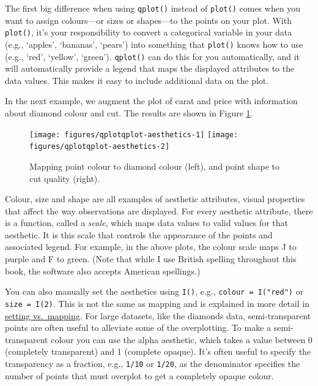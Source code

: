 The first big difference when using \texttt{qplot()} instead of
\texttt{plot()} comes when you want to assign colours---or sizes or
shapes---to the points on your plot. With \texttt{plot()}, it's your
responsibility to convert a categorical variable in your data (e.g.,
`apples', `bananas', `pears') into something that \texttt{plot()} knows
how to use (e.g., `red', `yellow', `green'). \texttt{qplot()} can do
this for you automatically, and it will automatically provide a legend
that maps the displayed attributes to the data values. This makes it
easy to include additional data on the plot.

In the next example, we augment the plot of carat and price with
information about diamond colour and cut. The results are shown in
Figure \ref{fig:qplot-aesthetics}.

\begin{Shaded}
\begin{Highlighting}[]
  
  
\end{Highlighting}
\end{Shaded}

\begin{figure}

{\centering \texttt{[image: figures/qplotqplot-aesthetics-1]} \texttt{[image: figures/qplotqplot-aesthetics-2]} 

}

\caption{Mapping point colour to diamond colour (left), and point shape to cut quality (right).\label{fig:qplot-aesthetics}}
\end{figure}

Colour, size and shape are all examples of aesthetic attributes, visual
properties that affect the way observations are displayed. For every
aesthetic attribute, there is a function, called a \emph{scale}, which
maps data values to valid values for that aesthetic. It is this scale
that controls the appearance of the points and associated legend. For
example, in the above plots, the colour scale maps J to purple and F to
green. (Note that while I use British spelling throughout this book, the
software also accepts American spellings.)

You can also manually set the aesthetics using \texttt{I()}, e.g.,
\texttt{colour = I("red")} or \texttt{size = I(2)}. This is not the same
as mapping and is explained in more detail in
\hyperref[sub:setting-mapping]{setting vs.~mapping}. For large datasets,
like the diamonds data, semi-transparent points are often useful to
alleviate some of the overplotting. To make a semi-transparent colour
you can use the alpha aesthetic, which takes a value between 0
(completely transparent) and 1 (complete opaque). It's often useful to
specify the transparency as a fraction, e.g., \texttt{1/10} or
\texttt{1/20}, as the denominator specifies the number of points that
must overplot to get a completely opaque colour.
 


